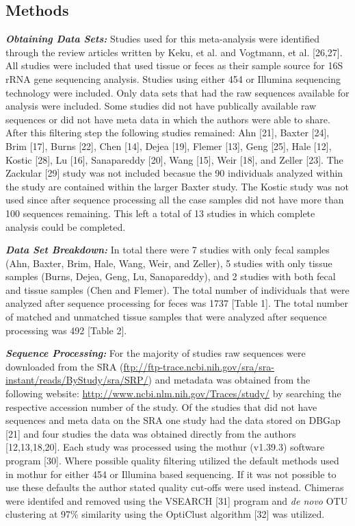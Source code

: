 \documentclass[12pt,]{article}
\begin{document}
\newpage

\subsection{Methods}\label{methods}

\textbf{\emph{Obtaining Data Sets:}} Studies used for this meta-analysis
were identified through the review articles written by Keku, et al. and
Vogtmann, et al. {[}26,27{]}. All studies were included that used tissue
or feces as their sample source for 16S rRNA gene sequencing analysis.
Studies using either 454 or Illumina sequencing technology were
included. Only data sets that had the raw sequences available for
analysis were included. Some studies did not have publically available
raw sequences or did not have meta data in which the authors were able
to share. After this filtering step the following studies remained: Ahn
{[}21{]}, Baxter {[}24{]}, Brim {[}17{]}, Burns {[}22{]}, Chen {[}14{]},
Dejea {[}19{]}, Flemer {[}13{]}, Geng {[}25{]}, Hale {[}12{]}, Kostic
{[}28{]}, Lu {[}16{]}, Sanapareddy {[}20{]}, Wang {[}15{]}, Weir
{[}18{]}, and Zeller {[}23{]}. The Zackular {[}29{]} study was not
included becasue the 90 individuals analyzed within the study are
contained within the larger Baxter study. The Kostic study was not used
since after sequence processing all the case samples did not have more
than 100 sequences remaining. This left a total of 13 studies in which
complete analysis could be completed.

\textbf{\emph{Data Set Breakdown:}} In total there were 7 studies with
only fecal samples (Ahn, Baxter, Brim, Hale, Wang, Weir, and Zeller), 5
studies with only tissue samples (Burns, Dejea, Geng, Lu, Sanapareddy),
and 2 studies with both fecal and tissue samples (Chen and Flemer). The
total number of individuals that were analyzed after sequence processing
for feces was 1737 {[}Table 1{]}. The total number of matched and
unmatched tissue samples that were analyzed after sequence processing
was 492 {[}Table 2{]}.

\textbf{\emph{Sequence Processing:}} For the majority of studies raw
sequences were downloaded from the SRA
(\url{ftp://ftp-trace.ncbi.nih.gov/sra/sra-instant/reads/ByStudy/sra/SRP/})
and metadata was obtained from the following website:
\url{http://www.ncbi.nlm.nih.gov/Traces/study/} by searching the
respective accession number of the study. Of the studies that did not
have sequences and meta data on the SRA one study had the data stored on
DBGap {[}21{]} and four studies the data was obtained directly from the
authors {[}12,13,18,20{]}. Each study was processed using the mothur
(v1.39.3) software program {[}30{]}. Where possible quality filtering
utilized the default methods used in mothur for either 454 or Illumina
based sequencing. If it was not possible to use these defaults the
author stated quality cut-offs were used instead. Chimeras were
identifed and removed using the VSEARCH {[}31{]} program and \emph{de
novo} OTU clustering at 97\% similarity using the OptiClust algorithm
{[}32{]} was utilized.
\end{document}
